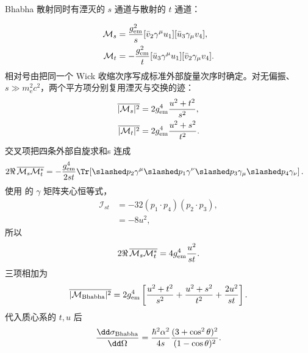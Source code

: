 \begin{derivation}
Bhabha 散射同时有湮灭的 $s$ 通道与散射的 $t$ 通道：

\begin{align*}
 \mathcal M_s
 &=\frac{g_{\rm em}^2}{s}
 [\bar v_2\gamma^\mu u_1]
 [\bar u_3\gamma_\mu v_4],\\
 \mathcal M_t
 &=-\frac{g_{\rm em}^2}{t}
 [\bar u_3\gamma^\mu u_1]
 [\bar v_2\gamma_\mu v_4].
 \end{align*}
相对号由把同一个 Wick 收缩次序写成标准外部旋量次序时确定。对无偏振、$s\gg m_{\mathrm e}^2c^2$，两个平方项分别复用湮灭与交换的迹：
\begin{align*}
 \overline{|\mathcal M_s|^2}
 &=2g_{\rm em}^4\frac{u^2+t^2}{s^2},\\
 \overline{|\mathcal M_t|^2}
 &=2g_{\rm em}^4\frac{u^2+s^2}{t^2}.
\end{align*}
交叉项把四条外部自旋求和s 连成
\begin{align*}
 2\Re\,\overline{\mathcal M_s\mathcal M_t^*}
 &=-\frac{g_{\rm em}^4}{2st}
 \Tr\!\left[
 \slashed p_2\gamma^\mu\slashed p_1\gamma^\nu
 \slashed p_3\gamma_\mu\slashed p_4\gamma_\nu
 \right].
 \end{align*}
使用  的 $\gamma$ 矩阵夹心恒等式，
\begin{align*}
 \mathcal I_{st}
 &=-32(p_1\!\cdot p_4)(p_2\!\cdot p_3),\\
 &=-8u^2,
\end{align*}
所以
\begin{equation*}
 2\Re\,\overline{\mathcal M_s\mathcal M_t^*}
 =4g_{\rm em}^4\frac{u^2}{st}.
\end{equation*}
三项相加为
\begin{equation*}
 {
 \overline{|\mathcal M_{\rm Bhabha}|^2}
 =2g_{\rm em}^4\left[
 \frac{u^2+t^2}{s^2}
 +\frac{u^2+s^2}{t^2}
 +\frac{2u^2}{st}
 \right].}
 \end{equation*}
代入质心系的 $t,u$ 后
\begin{equation*}
 {
 \frac{\dd\sigma_{\rm Bhabha}}{\dd\Omega}
 =\frac{\hbar^2\alpha^2}{4s}
 \frac{(3+\cos^2\theta)^2}{(1-\cos\theta)^2}.}
 \end{equation*}
\end{derivation}


